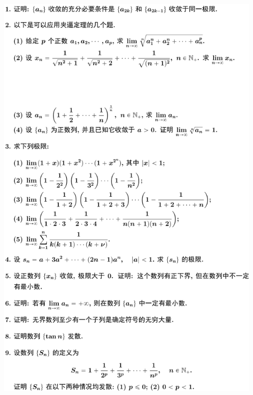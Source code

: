 \documentclass[11pt,a4paper]{ctexart}
\begin{document}
\begin{paracol}{2}
\includegraphics[width=\linewidth]{figure04.png}
\newpage
{}


\end{paracol}
\end{document}
